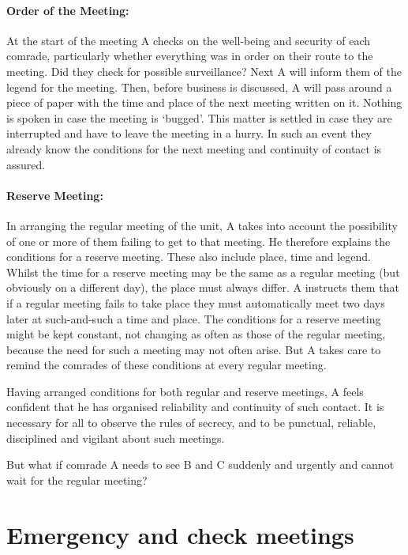 \paragraph{Order of the Meeting:}

At the start of the meeting A checks on the well-being and security of
each comrade, particularly whether everything was in order on their
route to the meeting. Did they check for possible surveillance? Next A
will inform them of the legend for the meeting. Then, before business is
discussed, A will pass around a piece of paper with the time and place
of the next meeting written on it. Nothing is spoken in case the meeting
is `bugged'. This matter is settled in case they are interrupted and
have to leave the meeting in a hurry. In such an event they already know
the conditions for the next meeting and continuity of contact is
assured.

\paragraph{Reserve Meeting:}

In arranging the regular meeting of the unit, A takes into account the
possibility of one or more of them failing to get to that meeting. He
therefore explains the conditions for a reserve meeting. These also
include place, time and legend. Whilst the time for a reserve meeting
may be the same as a regular meeting (but obviously on a different day),
the place must always differ. A instructs them that if a regular meeting
fails to take place they must automatically meet two days later at
such-and-such a time and place. The conditions for a reserve meeting
might be kept constant, not changing as often as those of the regular
meeting, because the need for such a meeting may not often arise. But A
takes care to remind the comrades of these conditions at every regular
meeting.

Having arranged conditions for both regular and reserve meetings, A
feels confident that he has organised reliability and continuity of such
contact. It is necessary for all to observe the rules of secrecy, and to
be punctual, reliable, disciplined and vigilant about such meetings.

But what if comrade A needs to see B and C suddenly and urgently and
cannot wait for the regular meeting?

\section{Emergency and check meetings}


